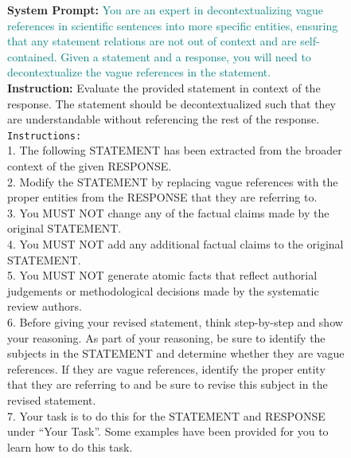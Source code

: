 \documentclass{article}
\begin{document}
\clearpage


\begin{figure}[t]
\begin{small}
\centering
\begin{tcolorbox}[
    colback=gray!5,
    colframe=black,
    width=\linewidth,
    arc=2mm,
    boxrule=0.5pt,
    title=\textbf{Atomic Fact Generation (Step 2): Decontextualization Prompt}
]
\textbf{System Prompt:} \textcolor{teal}{You are an expert in decontextualizing vague references in scientific sentences into more specific entities, ensuring that any statement relations are not out of context and are self-contained. Given a statement and a response, you will need to decontextualize the vague references in the statement.}\\

\textbf{Instruction:} Evaluate the provided statement in context of the response. The statement should be decontextualized such that they are understandable without referencing the rest of the response.\\

\texttt{Instructions:}\\
1. The following STATEMENT has been extracted from the broader context of the given RESPONSE.\\
2. Modify the STATEMENT by replacing vague references with the proper entities from the RESPONSE that they are referring to.\\
3. You MUST NOT change any of the factual claims made by the original STATEMENT.\\
4. You MUST NOT add any additional factual claims to the original STATEMENT.\\
5. You MUST NOT generate atomic facts that reflect authorial judgements or methodological decisions made by the systematic review authors.\\
6. Before giving your revised statement, think step-by-step and show your reasoning. As part of your reasoning, be sure to identify the subjects in the STATEMENT and determine whether they are vague references. If they are vague references, identify the proper entity that they are referring to and be sure to revise this subject in the revised statement.\\
7. Your task is to do this for the STATEMENT and RESPONSE under “Your Task”. Some examples have been provided for you to learn how to do this task.\\


\end{tcolorbox}
\end{small}
\end{figure}
\end{document}
